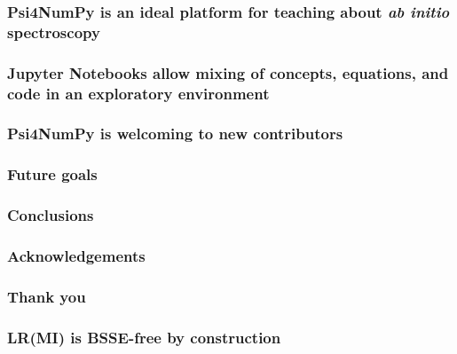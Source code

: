 \documentclass[xcolor=usenames,dvipsnames,svgnames]{beamer}
\newcommand\pfn{Psi4NumPy}
\begin{document}
\begin{frame}
  \frametitle{\pfn{} is an ideal platform for teaching about \textit{ab initio} spectroscopy}
\end{frame}

\begin{frame}
  \frametitle{Jupyter Notebooks allow mixing of concepts, equations, and code in an exploratory environment}
\end{frame}

\begin{frame}
  \frametitle{\pfn{} is welcoming to new contributors}
\end{frame}

\begin{frame}
  \frametitle{Future goals}
\end{frame}

\begin{frame}
  \frametitle{Conclusions}
\end{frame}

\begin{frame}
  \frametitle{Acknowledgements}
\end{frame}

\begin{frame}
  \frametitle{Thank you}
\end{frame}

\appendix

\begin{frame}
  \frametitle{LR(MI) is BSSE-free by construction}
\end{frame}
\end{document}

